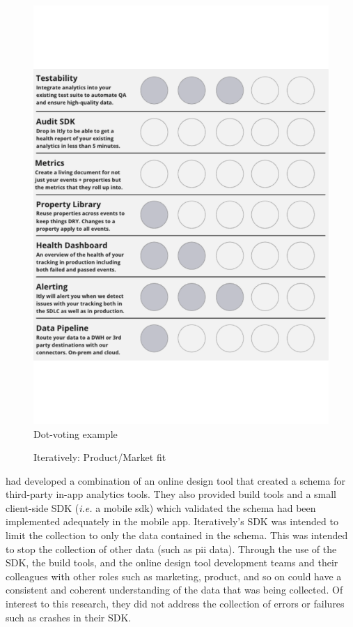 \begin{figure}
\begin{minipage}{.47\linewidth}
  \includegraphics[width=\linewidth]{images/iteratively/dot-voting-example.pdf}
  {\footnotesize Dot-voting example}
  \label{fig:iteratively-dot-voting-example}
\end{minipage}
    \caption{Iteratively: Product/Market fit}
    \label{fig:iteratively-product-market-fit}
\end{figure}

 had developed a combination of an online design tool that created a schema for third-party in-app analytics tools. They also provided build tools and a small client-side SDK (\emph{i.e.} a mobile \Gls{sdk}) which validated the schema had been implemented adequately in the mobile app. %
Iteratively's SDK was intended to limit the collection to only the data contained in the schema. This was intended to stop the collection of other data (such as \Gls{pii} data). Through the use of the SDK, the build tools, and the online design tool development teams and their colleagues with other roles such as marketing, product, and so on could have a consistent and coherent understanding of the data that was being collected. Of interest to this research, they did not address the collection of errors or failures such as crashes in their SDK.

